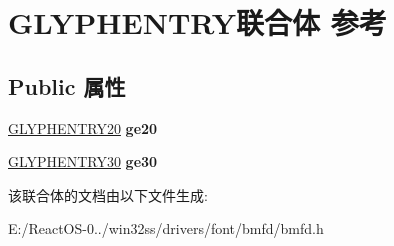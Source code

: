 \hypertarget{union_g_l_y_p_h_e_n_t_r_y}{}\section{G\+L\+Y\+P\+H\+E\+N\+T\+R\+Y联合体 参考}
\label{union_g_l_y_p_h_e_n_t_r_y}
\subsection*{Public 属性}
\begin{DoxyCompactItemize}
\item 
\mbox{\label{union_g_l_y_p_h_e_n_t_r_y_aa0d1492b3342503cc550533bc6a9ae8c}} 
\hyperlink{struct_g_l_y_p_h_e_n_t_r_y20}{G\+L\+Y\+P\+H\+E\+N\+T\+R\+Y20} {\bfseries ge20}
\item 
\mbox{\label{union_g_l_y_p_h_e_n_t_r_y_a3ed60c18685c1a48cd92f28abc3e95de}} 
\hyperlink{struct_g_l_y_p_h_e_n_t_r_y30}{G\+L\+Y\+P\+H\+E\+N\+T\+R\+Y30} {\bfseries ge30}
\end{DoxyCompactItemize}


该联合体的文档由以下文件生成\+:\begin{DoxyCompactItemize}
\item 
E\+:/\+React\+O\+S-\/0../win32ss/drivers/font/bmfd/bmfd.\+h\end{DoxyCompactItemize}
